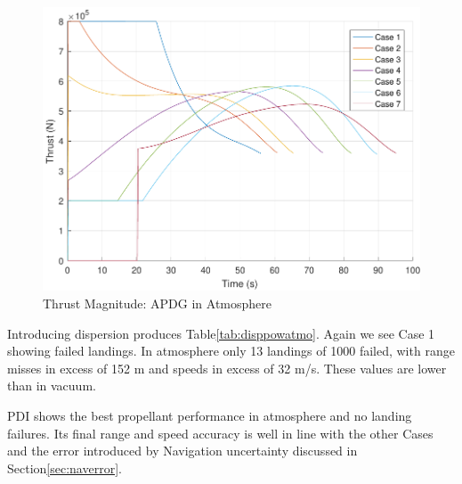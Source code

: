 \begin{figure}[H]
	\centering
	\begin{minipage}{4.3 in}
		\includegraphics[width=\linewidth]{Figures/thrpowatmo.pdf}
		\caption{Thrust Magnitude: APDG in Atmosphere \label{fig:thrpowatmo} }
	\end{minipage}
\end{figure}

Introducing dispersion produces Table\:\ref{tab:disppowatmo}. Again we see Case 1 showing failed landings. In atmosphere only 13 landings of 1000 failed, with range misses in excess of 152 m and speeds in excess of 32 m/s. These values are lower than in vacuum.

PDI shows the best propellant performance in atmosphere and no landing failures. Its final range and speed accuracy is well in line with the other Cases and the error introduced by Navigation uncertainty discussed in Section\:\ref{sec:naverror}.


